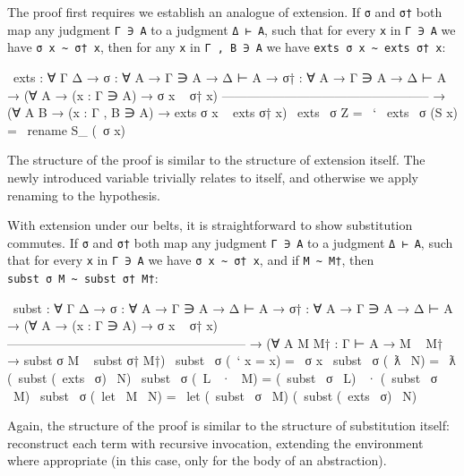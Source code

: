 The proof first requires we establish an analogue of extension. If
\texttt{σ} and \texttt{σ†} both map any judgment \texttt{Γ\ ∋\ A} to a
judgment \texttt{Δ\ ⊢\ A}, such that for every \texttt{x} in
\texttt{Γ\ ∋\ A} we have \texttt{σ\ x\ \textasciitilde{}\ σ†\ x}, then
for any \texttt{x} in \texttt{Γ\ ,\ B\ ∋\ A} we have
\texttt{exts\ σ\ x\ \textasciitilde{}\ exts\ σ†\ x}:

\begin{fence}
\begin{code}
~exts : ∀ {Γ Δ}
  → {σ  : ∀ {A} → Γ ∋ A → Δ ⊢ A}
  → {σ† : ∀ {A} → Γ ∋ A → Δ ⊢ A}
  → (∀ {A} → (x : Γ ∋ A) → σ x ~ σ† x)
    --------------------------------------------------
  → (∀ {A B} → (x : Γ , B ∋ A) → exts σ x ~ exts σ† x)
~exts ~σ Z      =  ~`
~exts ~σ (S x)  =  ~rename S_ (~σ x)
\end{code}
\end{fence}

The structure of the proof is similar to the structure of extension
itself. The newly introduced variable trivially relates to itself, and
otherwise we apply renaming to the hypothesis.

With extension under our belts, it is straightforward to show
substitution commutes. If \texttt{σ} and \texttt{σ†} both map any
judgment \texttt{Γ\ ∋\ A} to a judgment \texttt{Δ\ ⊢\ A}, such that for
every \texttt{x} in \texttt{Γ\ ∋\ A} we have
\texttt{σ\ x\ \textasciitilde{}\ σ†\ x}, and if
\texttt{M\ \textasciitilde{}\ M†}, then
\texttt{subst\ σ\ M\ \textasciitilde{}\ subst\ σ†\ M†}:

\begin{fence}
\begin{code}
~subst : ∀ {Γ Δ}
  → {σ  : ∀ {A} → Γ ∋ A → Δ ⊢ A}
  → {σ† : ∀ {A} → Γ ∋ A → Δ ⊢ A}
  → (∀ {A} → (x : Γ ∋ A) → σ x ~ σ† x)
    ---------------------------------------------------------
  → (∀ {A} {M M† : Γ ⊢ A} → M ~ M† → subst σ M ~ subst σ† M†)
~subst ~σ (~` {x = x})  =  ~σ x
~subst ~σ (~ƛ ~N)       =  ~ƛ (~subst (~exts ~σ) ~N)
~subst ~σ (~L ~· ~M)    =  (~subst ~σ ~L) ~· (~subst ~σ ~M)
~subst ~σ (~let ~M ~N)  =  ~let (~subst ~σ ~M) (~subst (~exts ~σ) ~N)
\end{code}
\end{fence}

Again, the structure of the proof is similar to the structure of
substitution itself: reconstruct each term with recursive invocation,
extending the environment where appropriate (in this case, only for the
body of an abstraction).


